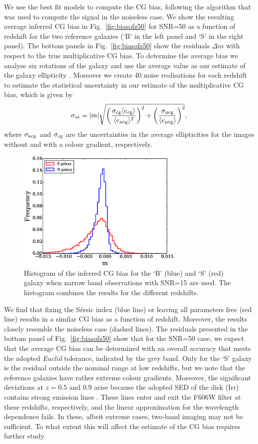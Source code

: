 \documentclass[useAMS,usenatbib]{mnras}
\newcommand{\be}{\begin{equation}}
\newcommand{\ee}{\end{equation}}
\newcommand{\rund}[1]{\left(#1\right)}
\def\elabel#1{\label{eq:#1}}
\begin{document}
We use the best fit models to compute the CG bias, following the algorithm that was used to compute the signal in the noiseless case. We show the resulting average inferred CG bias in Fig.~\ref{fig:biasofz50} for SNR=50 as a function of redshift for the two reference galaxies (`B' in the left panel and `S' in the
right panel). The bottom panels in Fig.~\ref{fig:biasofz50} show the residuals
$\Delta m$ with respect to the true multiplicative CG bias. To determine the average
bias we analyse six rotations of the galaxy and use the average value as our estimate of
the galaxy ellipticity \citep{Nakajima07}.  Moreover we create 40 noise realisations for
each redshift to estimate the statistical uncertainty in our estimate of the multiplicative
CG bias, which is given by
%
\be
\sigma_m= |m| \sqrt{\rund{\sigma_{\rm cg} \langle e_{\rm cg} \rangle \over \langle e_{\rm ncg}\rangle^2 }^2
  + \rund{\sigma_{\rm ncg} \over \langle e_{\rm ncg} \rangle}^2 },
\elabel{sigmam}
\ee
%
where $\sigma_{\rm ncg}$ and $\sigma_{\rm cg}$ are the uncertainties in the average
ellipticities for the images without and with a colour gradient, respectively.

\begin{figure}
  \includegraphics[width=8.0cm]{zs2n15his.eps}
  \caption{Histogram of the inferred CG bias for the `B' (blue) and
  `S' (red) galaxy when narrow band observations with SNR=15
  are used. The histogram combines the results for the different
  redshifts.}
  \label{fig:histogrambias}
\end{figure}

We find that fixing the S{\'e}rsic index (blue line) or leaving all parameters free (red line) results in a similar CG bias as a function of redshift. Moreover, the results closely resemble the noiseless case (dashed lines).
The residuals presented in the bottom panel of Fig.~\ref{fig:biasofz50} show that  for the SNR=50 case, we expect that the average CG bias can be determined with an overall accuracy that meets the adopted {\it Euclid} tolerance, indicated by the grey band. Only for the `S' galaxy is the residual outside the nominal range at low redshifts, but we note that the reference galaxies have rather extreme colour gradients.
Moreover, the significant deviations at $z=0.5$ and $0.9$ arise because the adopted SED of the disk (Irr) contains strong emission lines  . These lines enter and exit the F606W filter at these redshifts, respectively, and the linear approximation for the wavelength
dependence fails. In these, albeit extreme cases, two-band imaging may not be sufficient. To what extent this will affect the estimate of the CG bias requires further study.
\end{document}
